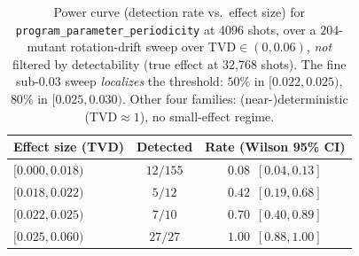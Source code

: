 \begin{table}[t]
\centering
\caption{Power curve (detection rate vs.\ effect size) for \texttt{program\_parameter\_periodicity} at 4096 shots, over a $204$-mutant rotation-drift sweep over TVD$\in(0,0.06)$, \emph{not} filtered by detectability (true effect at 32{,}768 shots). The fine sub-$0.03$ sweep \emph{localizes} the threshold: $50\%$ in $[0.022,0.025)$, $80\%$ in $[0.025,0.030)$. Other four families: (near-)deterministic (TVD$\approx 1$), no small-effect regime.}
\label{tab:power-curve}
\footnotesize
\begin{tabular}{lcc}
\toprule
Effect size (TVD) & Detected & Rate (Wilson 95\% CI) \\
\midrule
$[0.000,0.018)$ & $12/155$ & $0.08$~$[0.04,0.13]$ \\
$[0.018,0.022)$ & $5/12$  & $0.42$~$[0.19,0.68]$ \\
$[0.022,0.025)$ & $7/10$  & $0.70$~$[0.40,0.89]$ \\
$[0.025,0.060)$ & $27/27$ & $1.00$~$[0.88,1.00]$ \\
\bottomrule
\end{tabular}
\end{table}
